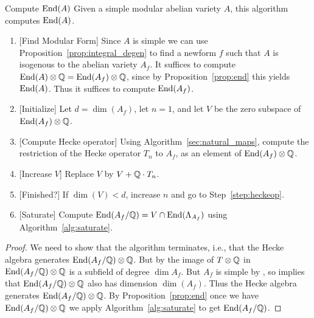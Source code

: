 \documentclass{article}
\begin{document}
\begin{algorithm}{Compute $\operatorname{End}(A)$}
    \label{alg:end_A}
    Given a simple modular abelian variety $A$, this algorithm
    computes $\operatorname{End}(A)$.
    \begin{enumerate}
        \item{} [Find Modular Form] Since $A$ is simple we can use
            Proposition~\ref{prop:integral_degen} to find a newform $f$ such
            that $A$ is isogenous to the abelian variety $A_f$.  It suffices to
            compute $\operatorname{End}(A)\otimes\mathbb{Q} = \operatorname{End}(A_f)\otimes\mathbb{Q}$, since by
            Proposition~\ref{prop:end} this yields $\operatorname{End}(A)$.  Thus it suffices
            to compute $\operatorname{End}(A_f)$.
        \item{} [Initialize] Let $d=\dim(A_f)$, let $n=1$, and let $V$ be the
            zero subspace of $\operatorname{End}(A_f)\otimes\mathbb{Q}$.
        \item{} [Compute Hecke operator]\label{step:heckeop} Using
            Algorithm~\ref{sec:natural_maps}, compute the restriction of the
            Hecke operator $T_n$ to $A_f$, as an element of
            $\operatorname{End}(A_f)\otimes\mathbb{Q}$.
        \item{} [Increase $V$] Replace $V$ by $V+\mathbb{Q}\cdot T_n$.
        \item{} [Finished?]  If $\dim(V) < d$, increase $n$ and go to
            Step~\ref{step:heckeop}.
        \item{} [Saturate] Compute $\operatorname{End}(A_f/\mathbb{Q}) = V \cap \operatorname{End}(\Lambda_{A_f})$
            using Algorithm~\ref{alg:saturate}.
    \end{enumerate}
\end{algorithm}
\begin{proof}
    We need to show that the algorithm terminates, i.e., that the Hecke
    algebra generates $\operatorname{End}(A_f/\mathbb{Q}) \otimes \mathbb{Q}$. But by
    \cite[Thm.~1]{shimura:factors} the image of $T \otimes \mathbb{Q}$ in
    $\operatorname{End}(A_f/\mathbb{Q}) \otimes \mathbb{Q}$ is a subfield of degree $\dim A_f$. But
    $A_f$ is simple by \cite[Cor.~4.2]{ribet:twists}, so
    \cite[Thm.~2.1]{ribet:abelian_varieties} implies that $\operatorname{End}(A_f/\mathbb{Q}) \otimes \mathbb{Q}$
    also has dimension $\dim(A_f)$. Thus the Hecke algebra generates
    $\operatorname{End}(A_f/\mathbb{Q}) \otimes \mathbb{Q}$. By Proposition~\ref{prop:end} once we
    have $\operatorname{End}(A_f/\mathbb{Q}) \otimes \mathbb{Q}$ we apply Algorithm~\ref{alg:saturate} to get
    $\operatorname{End}(A_f/\mathbb{Q})$.
\end{proof}
\end{document}

